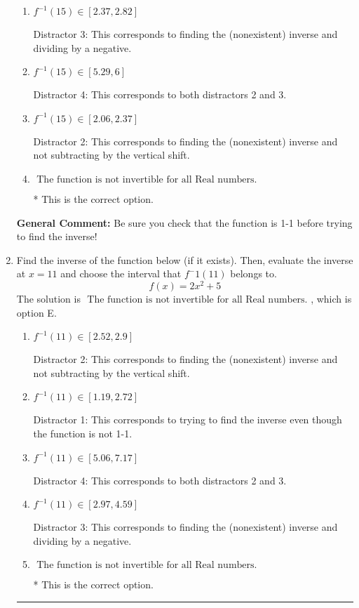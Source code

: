 \documentclass{extbook}[14pt]
\newcommand{\litem}[1]{\item #1

\rule{\textwidth}{0.4pt}}
\begin{document}
\begin{enumerate}
{\begin{enumerate}[label=\Alph*.]
 Distractor 1: This corresponds to trying to find the inverse even though the function is not 1-1. 
\item \( f^{-1}(15) \in [2.37, 2.82] \)

 Distractor 3: This corresponds to finding the (nonexistent) inverse and dividing by a negative.
\item \( f^{-1}(15) \in [5.29, 6] \)

 Distractor 4: This corresponds to both distractors 2 and 3.
\item \( f^{-1}(15) \in [2.06, 2.37] \)

 Distractor 2: This corresponds to finding the (nonexistent) inverse and not subtracting by the vertical shift.
\item \( \text{ The function is not invertible for all Real numbers. } \)

* This is the correct option.
\end{enumerate}

\textbf{General Comment:} Be sure you check that the function is 1-1 before trying to find the inverse!
}
\litem{
Find the inverse of the function below (if it exists). Then, evaluate the inverse at $x = 11$ and choose the interval that $f^-1(11)$ belongs to.
\[ f(x) = 2 x^2 + 5 \]The solution is \( \text{ The function is not invertible for all Real numbers. } \), which is option E.\begin{enumerate}[label=\Alph*.]
\item \( f^{-1}(11) \in [2.52, 2.9] \)

 Distractor 2: This corresponds to finding the (nonexistent) inverse and not subtracting by the vertical shift.
\item \( f^{-1}(11) \in [1.19, 2.72] \)

 Distractor 1: This corresponds to trying to find the inverse even though the function is not 1-1. 
\item \( f^{-1}(11) \in [5.06, 7.17] \)

 Distractor 4: This corresponds to both distractors 2 and 3.
\item \( f^{-1}(11) \in [2.97, 4.59] \)

 Distractor 3: This corresponds to finding the (nonexistent) inverse and dividing by a negative.
\item \( \text{ The function is not invertible for all Real numbers. } \)

* This is the correct option.
\end{enumerate}

}
\end{enumerate}
\end{document}
